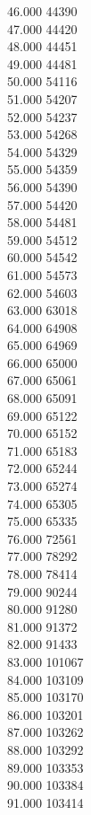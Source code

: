 { 46.000	44390 \\
 47.000	44420 \\
 48.000	44451 \\
 49.000	44481 \\
 50.000	54116 \\
 51.000	54207 \\
 52.000	54237 \\
 53.000	54268 \\
 54.000	54329 \\
 55.000	54359 \\
 56.000	54390 \\
 57.000	54420 \\
 58.000	54481 \\
 59.000	54512 \\
 60.000	54542 \\
 61.000	54573 \\
 62.000	54603 \\
 63.000	63018 \\
 64.000	64908 \\
 65.000	64969 \\
 66.000	65000 \\
 67.000	65061 \\
 68.000	65091 \\
 69.000	65122 \\
 70.000	65152 \\
 71.000	65183 \\
 72.000	65244 \\
 73.000	65274 \\
 74.000	65305 \\
 75.000	65335 \\
 76.000	72561 \\
 77.000	78292 \\
 78.000	78414 \\
 79.000	90244 \\
 80.000	91280 \\
 81.000	91372 \\
 82.000	91433 \\
 83.000	101067 \\
 84.000	103109 \\
 85.000	103170 \\
 86.000	103201 \\
 87.000	103262 \\
 88.000	103292 \\
 89.000	103353 \\
 90.000	103384 \\
 91.000	103414 \\
}
